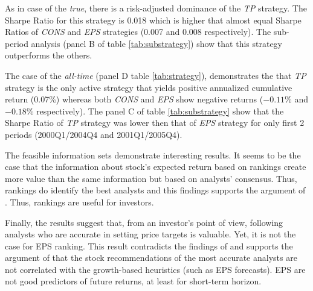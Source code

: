 \documentclass{book}
\newcommand{\tr}{\textit{true}}
\newcommand{\default}{\textit{all-time}}
\begin{document}
As in case of the \tr{}, there is a risk-adjusted dominance of the \textit{TP} strategy. The Sharpe Ratio for this strategy is 0.018 which is higher that almost equal Sharpe Ratios of \textit{CONS} and \textit{EPS} strategies  (0.007 and 0.008 respectively). The sub-period analysis (panel B of table \ref{tab:substrategy}) show that this strategy outperforms the others.


The case of the \default{} (panel D table \ref{tab:strategy}), demonstrates the that \textit{TP} strategy is the only active strategy that yields positive annualized cumulative return (0.07\%) whereas both  \textit{CONS} and \textit{EPS} show negative returns (\ensuremath{-0.11}\% and \ensuremath{-0.18}\% respectively). The panel C of table \ref{tab:substrategy} show that the Sharpe Ratio of \textit{TP} strategy was lower then that of \textit{EPS} strategy for only first 2 periods (2000Q1/2004Q4 and 2001Q1/2005Q4).

The feasible information sets demonstrate interesting results. It seems to be the case that the information about stock’s expected return based on rankings create more value than the same information but based on analysts’ consensus. Thus, rankings do identify the best analysts and this findings supports the argument of \cite{desai2000ass}. Thus, rankings are useful for investors.





Finally, the results suggest that, from an investor's point of view, following analysts who are accurate in setting price targets is valuable. Yet, it is not the case for EPS ranking.  This result contradicts the findings of \cite{bradshaw2004} and supports the argument of \cite{simon2011} that the stock recommendations of the most accurate analysts are not correlated with the growth-based heuristics (such as EPS forecasts). EPS are not good predictors of future returns, at least for short-term horizon.
\end{document}
